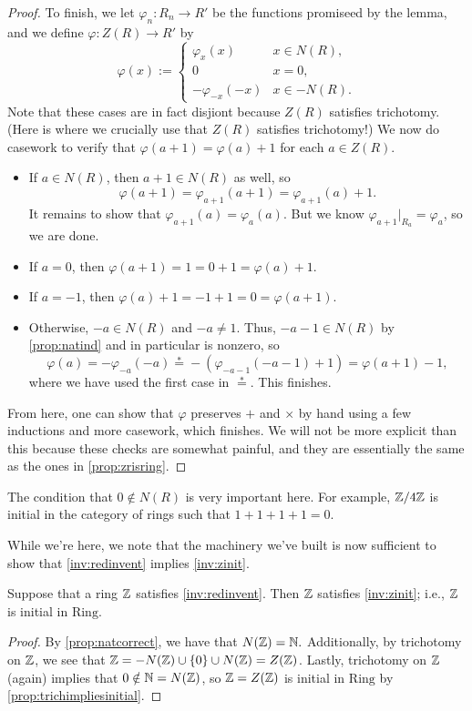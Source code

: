 \documentclass{article}
\begin{document}
\begin{proof}
	To finish, we let $\varphi_n:R_n\to R'$ be the functions promiseed by the lemma, and we define $\varphi:Z(R)\to R'$ by
	\[\varphi(x):=\begin{cases}
		\varphi_x(x) & x\in N(R), \\
		0 & x=0, \\
		-\varphi_{-x}(-x) & x\in-N(R).
	\end{cases}\]
	Note that these cases are in fact disjiont because $Z(R)$ satisfies trichotomy. (Here is where we crucially use that $Z(R)$ satisfies trichotomy!) We now do casework to verify that $\varphi(a+1)=\varphi(a)+1$ for each $a\in Z(R).$
	\begin{itemize}
		\item If $a\in N(R)$, then $a+1\in N(R)$ as well, so
		\[\varphi(a+1)=\varphi_{a+1}(a+1)=\varphi_{a+1}(a)+1.\]
		It remains to show that $\varphi_{a+1}(a)=\varphi_a(a)$. But we know $\varphi_{a+1}|_{R_a}=\varphi_a$, so we are done.
		\item If $a=0$, then $\varphi(a+1)=1=0+1=\varphi(a)+1$.
		\item If $a=-1$, then $\varphi(a)+1=-1+1=0=\varphi(a+1)$.
		\item Otherwise, $-a\in N(R)$ and $-a\ne1$. Thus, $-a-1\in N(R)$ by \autoref{prop:natind} and in particular is nonzero, so
		\[\varphi(a)=-\varphi_{-a}(-a)\stackrel*=-(\varphi_{-a-1}(-a-1)+1)=\varphi(a+1)-1,\]
		where we have used the first case in $\stackrel*=$. This finishes.
	\end{itemize}
	From here, one can show that $\varphi$ preserves $+$ and $\times$ by hand using a few inductions and more casework, which finishes. We will not be more explicit than this because these checks are somewhat painful, and they are essentially the same as the ones in \autoref{prop:zrisring}.
\end{proof}
\begin{remark} \label{rem:badinitial}
	The condition that $0\notin N(R)$ is very important here. For example, $\mathbb Z/4\mathbb Z$ is initial in the category of rings such that $1+1+1+1=0$.
\end{remark}
While we're here, we note that the machinery we've built is now sufficient to show that \autoref{inv:redinvent} implies \autoref{inv:zinit}.
\begin{theorem}
	Suppose that a ring $\mathbb Z$ satisfies \autoref{inv:redinvent}. Then $\mathbb Z$ satisfies \autoref{inv:zinit}; i.e., $\mathbb Z$ is initial in $\mathrm{Ring}$.
\end{theorem}
\begin{proof}
	By \autoref{prop:natcorrect}, we have that $N(\mathbb Z)=\mathbb N.$ Additionally, by trichotomy on $\mathbb Z$, we see that $\mathbb Z=-N(\mathbb Z)\cup\{0\}\cup N(\mathbb Z)=Z(\mathbb Z)$. Lastly, trichotomy on $\mathbb Z$ (again) implies that $0\notin\mathbb N=N(\mathbb Z)$, so $\mathbb Z=Z(\mathbb Z)$ is initial in $\mathrm{Ring}$ by \autoref{prop:trichimpliesinitial}.
\end{proof}
\end{document}
